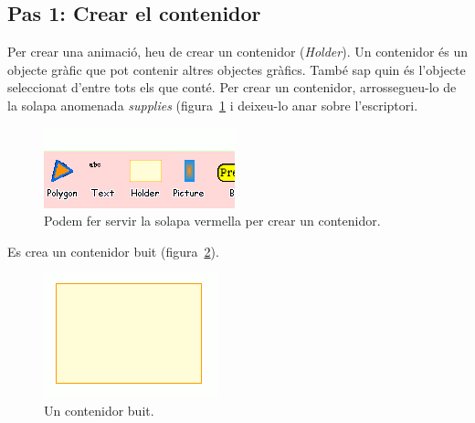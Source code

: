 \subsection{Pas 1: Crear el contenidor}
Per crear una animació, heu de crear un contenidor (\emph{Holder}). Un contenidor és un objecte gràfic que pot contenir altres objectes gràfics. També sap quin és l'objecte seleccionat d'entre tots els que conté. Per crear un contenidor, arrossegueu-lo de la solapa anomenada \emph{supplies} (figura~\ref{fig2418} i deixeu-lo anar sobre l'escriptori.
\begin{figure}[h!]
\begin{center}
\includegraphics[scale=1]{Imatges/figura24-18}
\end{center}
\caption{Podem fer servir la solapa vermella per crear un contenidor.}
\label{fig2418}
\end{figure}

Es crea un contenidor buit (figura~\ref{fig2419}).
\begin{figure}[h!]
\begin{center}
\includegraphics[scale=0.5]{Imatges/figura24-19}
\end{center}
\caption{Un contenidor buit.}
\label{fig2419}
\end{figure}

